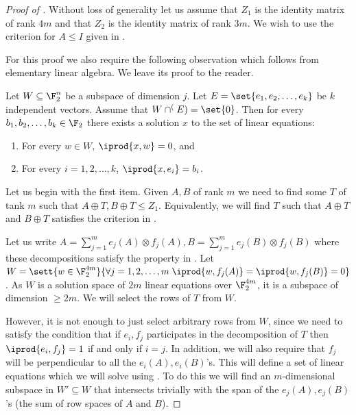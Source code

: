\begin{proof}[Proof of ]
    Without loss of generality let us assume that \(Z_1\) is the identity matrix of rank \(4m\) and that \(Z_2\) is the identity matrix of rank \(3m\). We wish to use the criterion for \(A \leq I\) given in .

    For this proof we also require the following observation which follows from elementary linear algebra. We leave its proof to the reader.
    \begin{observation}\label{obs:solution-to-non-homogenuous-linear-equations}
        Let \(W \subseteq \F_2^n\) be a subspace of dimension \(j\). Let \(E = \set{e_1,e_2,\dots,e_k}\) be \(k\) independent vectors. Assume that \(W \cap \sp(E) = \set{0}\). Then for every \(b_1,b_2,\dots,b_k \in \F_2\) there exists a solution \(x\) to the set of linear equations:
        \begin{enumerate}
            \item For every \(w \in W\), \(\iprod{x, w} = 0\), and
            \item For every \(i=1,2,\dots,k\), \(\iprod{x,e_i} = b_i\).
        \end{enumerate}
    \end{observation}

    Let us begin with the first item. Given \(A,B\) of rank \(m\) we need to find some \(T\) of tank \(m\) such that \(A \oplus T, B \oplus T \leq Z_1\). Equivalently, we will find \(T\) such that \(A \oplus T\) and \(B \oplus T\) satisfies the criterion in .
    
    Let us write \(A = \sum_{j=1}^{m} e_j(A) \otimes f_j(A), B=\sum_{j=1}^{m}e_j(B) \otimes f_j(B)\) where these decompositions satisfy the property in . Let \(W = \sett{w \in \F_2^{4m}}{\forall j=1,2,\dots,m \; \iprod{w,f_j(A)}=\iprod{w,f_j(B)}=0}\). As \(W\) is a solution space of \(2m\) linear equations over \(\F_2^{4m}\), it is a subspace of dimension \(\geq 2m\). We will select the rows of \(T\) from \(W\). 
    
    However, it is not enough to just select arbitrary rows from \(W\), since we need to satisfy the condition that if \(e_i, f_j\) participates in the decomposition of \(T\) then \(\iprod{e_i,f_j}=1\) if and only if \(i=j\). In addition, we will also require that \(f_j\) will be perpendicular to all the \(e_i(A),e_i(B)\)'s. This will define a set of linear equations which we will solve using . To do this we will find an \(m\)-dimensional subspace in \(W' \subseteq W\) that intersects trivially with the span of the \(e_j(A),e_j(B)\)'s (the sum of row spaces of \(A\) and \(B\)).


\end{proof}
